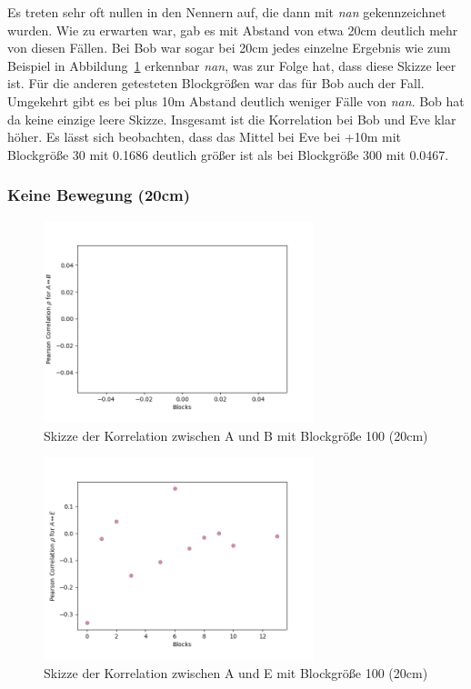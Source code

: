 \documentclass[12pt,a4paper]{article}
\begin{document}
Es treten sehr oft nullen in den Nennern auf, die dann mit 
\textit{nan} gekennzeichnet wurden. Wie zu erwarten war, gab 
es mit Abstand von etwa 20cm deutlich mehr von diesen Fällen. 
Bei Bob war sogar bei 20cm jedes einzelne Ergebnis wie 
zum Beispiel in Abbildung~\ref{fig:Label8} erkennbar \textit{nan},
was zur Folge hat, dass diese Skizze leer ist. Für die anderen 
getesteten Blockgrößen war das für Bob auch der Fall.
Umgekehrt gibt es bei plus 10m Abstand deutlich weniger Fälle
von \textit{nan}. Bob hat da keine einzige leere Skizze.
Insgesamt ist die Korrelation bei Bob und Eve klar höher.
Es lässt sich beobachten, dass das Mittel bei Eve bei +10m mit 
Blockgröße 30 mit 0.1686 deutlich größer ist als bei Blockgröße 
300 mit 0.0467.

\newpage
\subsubsection*{Keine Bewegung (20cm)}


\begin{figure}[hbt!]
	\centering
		\includegraphics[width=0.7\textwidth ]
		{Bilder/a3-t3a-ob-block100-correlation-AB.png}
		\caption{Skizze der Korrelation zwischen A und B mit Blockgröße 100 (20cm)}
		\label{fig:Label8}
\end{figure}

\begin{figure}[hbt!]
	\centering
		\includegraphics[width=0.7\textwidth ]
		{Bilder/a3-t3a-ob-block100-correlation-AE.png}
		\caption{Skizze der Korrelation zwischen A und E mit Blockgröße 100 (20cm)}
		\label{fig:Label9}
\end{figure}
\clearpage
\end{document}
